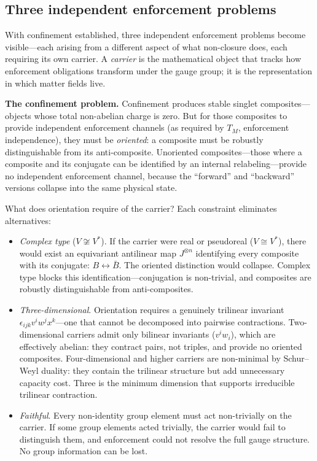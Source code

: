 \documentclass[11pt]{article}
\newenvironment{varlist}{\begin{itemize}[nosep,leftmargin=2em]}{\end{itemize}}
\begin{document}
\subsection{Three independent enforcement problems}

With confinement established, three independent enforcement problems become visible---each arising from a different aspect of what non-closure does, each requiring its own carrier.  A \emph{carrier} is the mathematical object that tracks how enforcement obligations transform under the gauge group; it is the representation in which matter fields live.

\textbf{The confinement problem.}  Confinement produces stable singlet composites---objects whose total non-abelian charge is zero.  But for those composites to provide independent enforcement channels (as required by $T_M$, enforcement independence), they must be \emph{oriented}: a composite must be robustly distinguishable from its anti-composite.  Unoriented composites---those where a composite and its conjugate can be identified by an internal relabeling---provide no independent enforcement channel, because the ``forward'' and ``backward'' versions collapse into the same physical state.

What does orientation require of the carrier?  Each constraint eliminates alternatives:

\begin{varlist}
\item \textit{Complex type} ($V \not\cong V^*$).  If the carrier were real or pseudoreal ($V \cong V^*$), there would exist an equivariant antilinear map $J^{\otimes n}$ identifying every composite with its conjugate: $B \leftrightarrow \bar{B}$.  The oriented distinction would collapse.  Complex type blocks this identification---conjugation is non-trivial, and composites are robustly distinguishable from anti-composites.
\item \textit{Three-dimensional}.  Orientation requires a genuinely trilinear invariant $\epsilon_{ijk} v^i w^j x^k$---one that cannot be decomposed into pairwise contractions.  Two-dimensional carriers admit only bilinear invariants ($v^i w_i$), which are effectively abelian: they contract pairs, not triples, and provide no oriented composites.  Four-dimensional and higher carriers are non-minimal by Schur--Weyl duality: they contain the trilinear structure but add unnecessary capacity cost.  Three is the minimum dimension that supports irreducible trilinear contraction.
\item \textit{Faithful}.  Every non-identity group element must act non-trivially on the carrier.  If some group elements acted trivially, the carrier would fail to distinguish them, and enforcement could not resolve the full gauge structure.  No group information can be lost.
\end{varlist}
\end{document}
